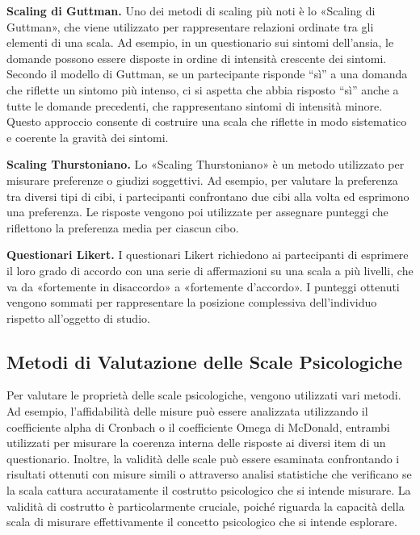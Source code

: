 \documentclass[
  letterpaper,
  krantz2]{{[}./krantz{]}}
\begin{document}
\textbf{Scaling di Guttman.} Uno dei metodi di scaling più noti è lo
«Scaling di Guttman», che viene utilizzato per rappresentare relazioni
ordinate tra gli elementi di una scala. Ad esempio, in un questionario
sui sintomi dell'ansia, le domande possono essere disposte in ordine di
intensità crescente dei sintomi. Secondo il modello di Guttman, se un
partecipante risponde ``sì'' a una domanda che riflette un sintomo più
intenso, ci si aspetta che abbia risposto ``sì'' anche a tutte le
domande precedenti, che rappresentano sintomi di intensità minore.
Questo approccio consente di costruire una scala che riflette in modo
sistematico e coerente la gravità dei sintomi.

\textbf{Scaling Thurstoniano.} Lo «Scaling Thurstoniano» è un metodo
utilizzato per misurare preferenze o giudizi soggettivi. Ad esempio, per
valutare la preferenza tra diversi tipi di cibi, i partecipanti
confrontano due cibi alla volta ed esprimono una preferenza. Le risposte
vengono poi utilizzate per assegnare punteggi che riflettono la
preferenza media per ciascun cibo.

\textbf{Questionari Likert.} I questionari Likert richiedono ai
partecipanti di esprimere il loro grado di accordo con una serie di
affermazioni su una scala a più livelli, che va da «fortemente in
disaccordo» a «fortemente d'accordo». I punteggi ottenuti vengono
sommati per rappresentare la posizione complessiva dell'individuo
rispetto all'oggetto di studio.

\subsection{Metodi di Valutazione delle Scale
Psicologiche}\label{metodi-di-valutazione-delle-scale-psicologiche}

Per valutare le proprietà delle scale psicologiche, vengono utilizzati
vari metodi. Ad esempio, l'affidabilità delle misure può essere
analizzata utilizzando il coefficiente alpha di Cronbach o il
coefficiente Omega di McDonald, entrambi utilizzati per misurare la
coerenza interna delle risposte ai diversi item di un questionario.
Inoltre, la validità delle scale può essere esaminata confrontando i
risultati ottenuti con misure simili o attraverso analisi statistiche
che verificano se la scala cattura accuratamente il costrutto
psicologico che si intende misurare. La validità di costrutto è
particolarmente cruciale, poiché riguarda la capacità della scala di
misurare effettivamente il concetto psicologico che si intende
esplorare.
\end{document}
